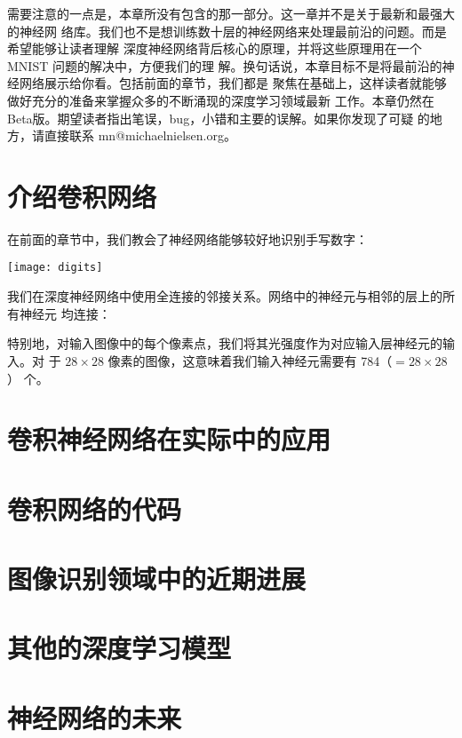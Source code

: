 需要注意的一点是，本章所没有包含的那一部分。这一章并不是关于最新和最强大的神经网
络库。我们也不是想训练数十层的神经网络来处理最前沿的问题。而是希望能够让读者理解
深度神经网络背后核心的原理，并将这些原理用在一个 MNIST 问题的解决中，方便我们的理
解。换句话说，本章目标不是将最前沿的神经网络展示给你看。包括前面的章节，我们都是
聚焦在基础上，这样读者就能够做好充分的准备来掌握众多的不断涌现的深度学习领域最新
工作。本章仍然在Beta版。期望读者指出笔误，bug，小错和主要的误解。如果你发现了可疑
的地方，请直接联系 mn@michaelnielsen.org。

\section{介绍卷积网络}
\label{sec:convolutional_networks}

在前面的章节中，我们教会了神经网络能够较好地识别手写数字：
\begin{center}
  \texttt{[image: digits]}
\end{center}

我们在深度神经网络中使用全连接的邻接关系。网络中的神经元与相邻的层上的所有神经元
均连接：

特别地，对输入图像中的每个像素点，我们将其光强度作为对应输入层神经元的输入。对
于 $28 \times 28$ 像素的图像，这意味着我们输入神经元需要有 784（$= 28 \times 28$）
个。

\section{卷积神经网络在实际中的应用}

\section{卷积网络的代码}

\section{图像识别领域中的近期进展}

\section{其他的深度学习模型}

\section{神经网络的未来}
